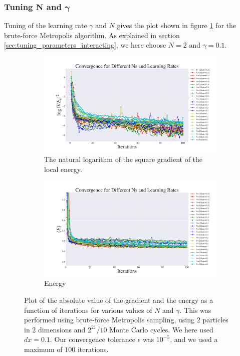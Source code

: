 \documentclass[a4paper, 10pt]{article}
\begin{document}
\subsubsection{Tuning $\boldsymbol{N}$ and $\boldsymbol{\gamma}$}
Tuning of the learning rate $\gamma$ and $N$ gives the plot shown in figure \ref{fig:step_size_and_N_interacting} for the brute-force Metropolis algorithm. As explained in section \ref{sec:tuning_parameters_interacting}, we here choose $N=2$ and $\gamma=0.1$.\\
\begin{figure}[ht!]
		\begin{subfigure}[t]{.9\textwidth}
			\centering
			\includegraphics[width=\textwidth]{../Results/grad_normal_interacting.pdf}
			\caption{The natural logarithm of the square gradient of the local energy.}
		\end{subfigure}%
		
		\begin{subfigure}[b]{.9\textwidth}
			\centering
			\includegraphics[width=\textwidth]{../Results/energy_normal_interacting.pdf}
			\caption{Energy}
		\end{subfigure}%
	\caption{Plot of the absolute value of the gradient and the energy as a function of iterations for various values of $N$ and $\gamma$. This was performed using brute-force Metropolis sampling, using $2$ particles in $2$ dimensions and $2^{21}/10$ Monte Carlo cycles. We here used $dx=0.1$. Our convergence tolerance $\epsilon$ was $10^{-5}$, and we used a maximum of $100$ iterations.}\label{fig:step_size_and_N_interacting}
\end{figure}\\
\end{document}
